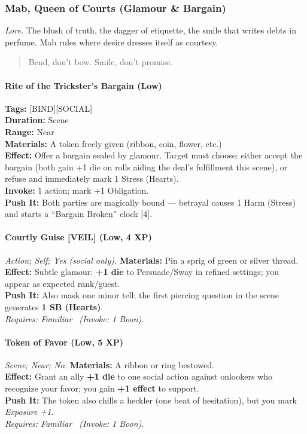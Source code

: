 \subsubsection{Mab, Queen of Courts (Glamour \& Bargain)}
\textit{Lore.} The blush of truth, the dagger of etiquette, the smile that writes debts in perfume. Mab rules where desire dresses itself as courtesy.

\begin{quote}
Bend, don’t bow. Smile, don’t promise.
\end{quote}

\paragraph*{Rite of the Trickster’s Bargain (Low)}
\textbf{Tags:} [BIND][SOCIAL] \\
\textbf{Duration:} Scene \\
\textbf{Range:} Near \\
\textbf{Materials:} A token freely given (ribbon, coin, flower, etc.) \\

\textbf{Effect:} Offer a bargain sealed by glamour. Target must choose: either accept the bargain (both gain +1 die on rolls aiding the deal’s fulfillment this scene), or refuse and immediately mark 1 Stress (Hearts). \\
\textbf{Invoke:} 1 action; mark +1 Obligation. \\
\textbf{Push It:} Both parties are magically bound — betrayal causes 1 Harm (Stress) and starts a “Bargain Broken” clock [4]. \\

\paragraph{Courtly Guise \textnormal{[VEIL]} (Low, 4 XP)} \emph{Action; Self; Yes (social only).}
\textbf{Materials:} Pin a sprig of green or silver thread.\\
\textbf{Effect:} Subtle glamour: \textbf{+1 die} to Persuade/Sway in refined settings; you appear as expected rank/guest.\\
\textbf{Push It:} Also mask one minor tell; the first piercing question in the scene generates \textbf{1 SB (Hearts)}.\\
\emph{Requires: Familiar \ (\textit{Invoke:} 1 Boon).}

\paragraph{Token of Favor (Low, 5 XP)} \emph{Scene; Near; No.}
\textbf{Materials:} A ribbon or ring bestowed.\\
\textbf{Effect:} Grant an ally \textbf{+1 die} to one social action against onlookers who recognize your favor; you gain \textbf{+1 effect} to support.\\
\textbf{Push It:} The token also chills a heckler (one beat of hesitation), but you mark \emph{Exposure +1}.\\
\emph{Requires: Familiar \ (\textit{Invoke:} 1 Boon).}

